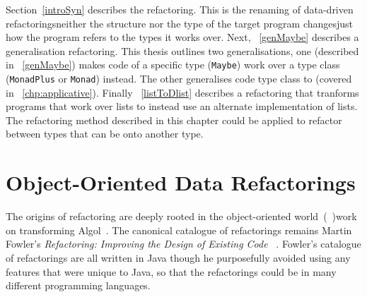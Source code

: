 Section~\ref{introSyn} describes the \DIFdelbegin {}\DIFdelend \DIFaddbegin {}\DIFaddend refactoring. This is the renaming of data-driven refactorings\DIFdelbegin \DIFdel{, }\DIFdelend \DIFaddbegin \DIFadd{: }\DIFaddend neither the structure nor the type of the target program changes\DIFaddbegin \DIFadd{, }\DIFaddend just how the program refers to the types it works over. Next, \DIFdelbegin {}\DIFdelend \DIFaddbegin {}\DIFaddend ~\ref{genMaybe} describes a generalisation refactoring. This thesis outlines two generalisations, one (described in \DIFdelbegin {}\DIFdelend \DIFaddbegin {}\DIFaddend ~\ref{genMaybe}) makes code of a specific type (\texttt{Maybe}) work over a type class (\texttt{MonadPlus} or \texttt{Monad}) instead. The other generalises code \DIFdelbegin {}\DIFdelend \DIFaddbegin {}\DIFaddend type class to \DIFdelbegin {}\DIFdelend \DIFaddbegin {}\DIFaddend (covered in \DIFdelbegin {}\DIFdelend \DIFaddbegin {}\DIFaddend ~\ref{chp:applicative}). Finally \DIFdelbegin {}\DIFdelend \DIFaddbegin {}\DIFaddend ~\ref{listToDlist} describes a refactoring that tranforms programs that work over lists to instead use an alternate implementation of lists. The refactoring method described in this chapter could be applied to refactor between \DIFaddbegin {}\DIFaddend types that can be \DIFdelbegin {}\DIFdelend \DIFaddbegin {}\DIFaddend onto another type. \DIFaddbegin {}\texttt{}\texttt{}\texttt{} \texttt{} \DIFaddend 

\section{Object-Oriented Data Refactorings}\label{ooRefs}

The origins of refactoring are deeply rooted in the object-oriented world~(\cite{programRestructuring}\DIFdelbegin \DIFdel{,}\DIFdelend \DIFaddbegin \DIFadd{;}\DIFaddend ~\cite{refactOOFrameworks})\DIFdelbegin {}\DIFdelend \DIFaddbegin {}\DIFaddend work on transforming Algol~\citep{recursiveTransformation}. The canonical catalogue of refactorings remains Martin Fowler's \emph{Refactoring: Improving the Design of Existing Code} ~\citep{fowler}. Fowler's catalogue of refactorings are all written in Java though he purposefully avoided using any features that were unique to Java, so that the refactorings could be \DIFdelbegin {}\DIFdelend \DIFaddbegin {}\DIFaddend in many different \DIFaddbegin {}\DIFaddend programming languages.

